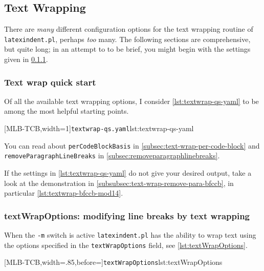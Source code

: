 \subsection{Text Wrapping}\label{subsec:textwrapping}
	There are \emph{many} different configuration options for the text wrapping routine of
	\texttt{latexindent.pl}, perhaps \emph{too} many. The following sections are
	comprehensive, but quite long; in an attempt to to be brief, you might begin with the
	settings given in \cref{subsec:textwrapping-quick-start}.

\subsubsection{Text wrap quick start}\label{subsec:textwrapping-quick-start}

	Of all the available text wrapping options, I consider \cref{lst:textwrap-qs-yaml} to be
	among the most helpful starting points.

	[MLB-TCB,width=1\linewidth]{\texttt{textwrap-qs.yaml}}{lst:textwrap-qs-yaml}


	You can read about \texttt{perCodeBlockBasis} in \cref{subsec:text-wrap-per-code-block}
	and \texttt{removeParagraphLineBreaks} in \cref{subsec:removeparagraphlinebreaks}.

	If the settings in \cref{lst:textwrap-qs-yaml} do not give your desired output, take a
	look at the demonstration in \cref{subsubsec:text-wrap-remove-para-bfccb}, in particular
	\cref{lst:textwrap-bfccb-mod14}.

\subsubsection{textWrapOptions: modifying line breaks by text wrapping}

	When the \texttt{-m} switch is active \texttt{latexindent.pl} has the ability to wrap
	text using the options%
	 specified in the \texttt{textWrapOptions} field,
	see \cref{lst:textWrapOptions}.


	[MLB-TCB,width=.85\linewidth,before=\centering]{\texttt{textWrapOptions}}{lst:textWrapOptions}

